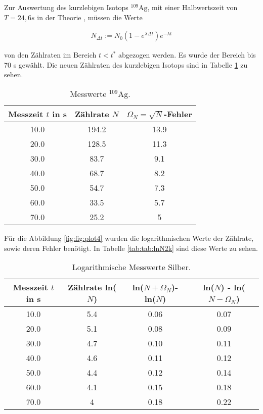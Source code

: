 Zur Auswertung des kurzlebigen Isotops $^{109}\text{Ag}$, mit einer Halbwertszeit von $T = 24,6 s$ in der Theorie \cite{Periode}, müssen die Werte 

\begin{align*}
  N_{\Delta t} := N_0(1-e^{\lambda \Delta t})e^{-\lambda t}
\end{align*}

von den Zählraten im Bereich $t < t^*$ abgezogen werden.
Es wurde der Bereich bis 70 s gewählt.
Die neuen Zählraten des kurzlebigen Isotops sind in Tabelle \ref{tab:Nk} zu sehen. 

\begin{table}
  \centering
  \caption{Messwerte $^{109}$Ag.}
  \label{tab:Nk}
\begin{tabular}{c c c}
  \toprule
  Messzeit $t$ in s & Zählrate $N$ & $\Omega_N = \sqrt{N}$-Fehler\\
  \midrule
  10.0 & 194.2 & 13.9\\
  20.0 & 128.5 & 11.3 \\
  30.0 & 83.7 & 9.1 \\
  40.0 & 68.7 & 8.2 \\
  50.0 & 54.7 & 7.3 \\
  60.0 & 33.5 & 5.7 \\
  70.0 & 25.2 & 5 \\
  \bottomrule
\end{tabular}
\end{table}
\FloatBarrier

Für die Abbildung \ref{fig:fig:plot4} wurden die logarithmischen Werte der Zählrate, sowie deren Fehler benötigt.
In Tabelle \ref{tab:tab:lnN2k} sind diese Werte zu sehen.

\begin{table}
  \centering
  \caption{Logarithmische Messwerte Silber.}
  \label{tab:lnN2k}
\begin{tabular}{c c c c}
  \toprule
  Messzeit $t$ in s & Zählrate ln($N$) & ln($N + \Omega_N$)- ln($N$) & ln($N$) - ln($N - \Omega_N$)\\
  \midrule
  10.0 & 5.4 & 0.06 & 0.07 \\
  20.0 & 5.1 & 0.08 & 0.09 \\
  30.0 & 4.7 & 0.10 & 0.11 \\
  40.0 & 4.6 & 0.11 & 0.12 \\
  50.0 & 4.4 & 0.12 & 0.14 \\
  60.0 & 4.1 & 0.15 & 0.18 \\
  70.0 & 4 & 0.18 & 0.22 \\
  \bottomrule
\end{tabular}
\end{table}
\FloatBarrier

